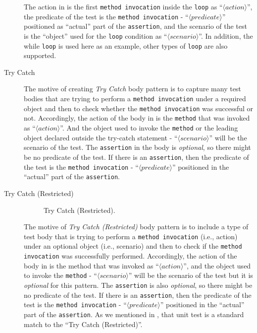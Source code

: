 \begin{description}
The action in  is the first \texttt{method invocation} inside the \texttt{loop} as \enquote{$\langle action \rangle$}, the predicate of the test is the \texttt{method invocation} - \enquote{$\langle predicate \rangle$} positioned as \enquote{actual} part of the \texttt{assertion}, and the scenario of the test is the \enquote{object} used for the \texttt{loop} condition as \enquote{$\langle scenario \rangle$}.
%
In addition, the while \texttt{loop} is used here as an example, other types of \texttt{loop} are also supported.

\item[Try Catch]

The motive of creating \textit{Try Catch} body pattern is to capture many test bodies that are trying to perform a \texttt{method invocation} under a required object and then to check whether the \texttt{method invocation} was successful or not.
%
Accordingly, the action of the body in  is the \texttt{method} that was invoked as \enquote{$\langle action \rangle$}.
%
And the object used to invoke the \texttt{method} or the leading object declared outside the try-catch statement - \enquote{$\langle scenario \rangle$} will be the scenario of the test.
%
The \texttt{assertion} in the body is \emph{optional}, so there might be no predicate of the test.
%
If there is an \texttt{assertion}, then the predicate of the test is the \texttt{method invocation} - \enquote{$\langle predicate \rangle$} positioned in the \enquote{actual} part of the \texttt{assertion}.


\item[Try Catch (Restricted)] 

\begin{figure}[htbp]
\centering
    \begin{subfigure}{0.8\textwidth}
    \end{subfigure}
\caption{Try Catch (Restricted).}
\label{tc_one}
\end{figure}

The motive of \textit{Try Catch (Restricted)} body pattern is to include a type of test body that is trying to perform a \texttt{method invocation} (i.e., action) under an optional object (i.e., scenario) and then to check if the \texttt{method invocation} was successfully performed.
%
Accordingly, the action of the body in  is the method that was invoked as \enquote{$\langle action \rangle$}, and the object used to invoke the \texttt{method} - \enquote{$\langle scenario \rangle$} will be the scenario of the test but it is \emph{optional} for this pattern.
%
The \texttt{assertion} is also \emph{optional}, so there might be no predicate of the test.
%
If there is an \texttt{assertion}, then the predicate of the test is the \texttt{method invocation} - \enquote{$\langle predicate \rangle$} positioned in the \enquote{actual} part of the \texttt{assertion}.
%
As we mentioned in , that unit test is a standard match to the \enquote{Try Catch (Restricted)}.



\end{description}
